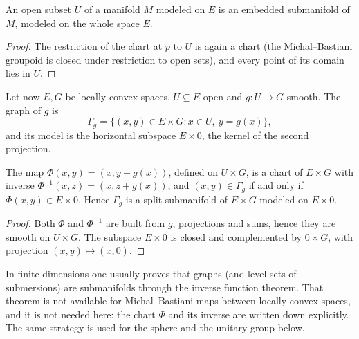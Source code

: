 \begin{proposition}
  \label{prop:ex-open}
  \leanok
  An open subset $U$ of a manifold $M$ modeled on $E$ is an embedded submanifold of $M$, modeled
  on the whole space $E$.
\end{proposition}

\begin{proof}
  \leanok
  The restriction of the chart at $p$ to $U$ is again a chart (the Michal--Bastiani groupoid is
  closed under restriction to open sets), and every point of its domain lies in $U$.
\end{proof}

Let now $E, G$ be locally convex spaces, $U \subseteq E$ open and $g \colon U \to G$ smooth.
The graph of $g$ is
\[
  \Gamma_g = \{(x, y) \in E \times G : x \in U,\ y = g(x)\},
\]
and its model is the horizontal subspace $E \times 0$, the kernel of the second projection.

\begin{proposition}[Graphs]
  \label{prop:ex-graph}
  \leanok
  The map $\Phi(x, y) = (x, y - g(x))$, defined on $U \times G$, is a chart of $E \times G$ with
  inverse $\Phi^{-1}(x, z) = (x, z + g(x))$, and $(x, y) \in \Gamma_g$ if and only if
  $\Phi(x, y) \in E \times 0$. Hence $\Gamma_g$ is a split submanifold of $E \times G$ modeled on
  $E \times 0$.
\end{proposition}

\begin{proof}
  \leanok
  Both $\Phi$ and $\Phi^{-1}$ are built from $g$, projections and sums, hence they are smooth on
  $U \times G$. The subspace $E \times 0$ is closed and complemented by $0 \times G$, with
  projection $(x, y) \mapsto (x, 0)$.
\end{proof}

\begin{remark}
  In finite dimensions one usually proves that graphs (and level sets of submersions) are
  submanifolds through the inverse function theorem. That theorem is not available for
  Michal--Bastiani maps between locally convex spaces, and it is not needed here: the chart
  $\Phi$ and its inverse are written down explicitly. The same strategy is used for the sphere
  and the unitary group below.
\end{remark}

